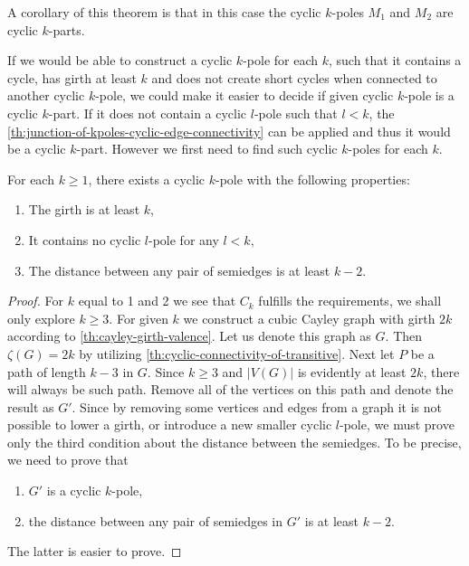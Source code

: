 \documentclass[12pt, twoside]{book}
\begin{document}
A corollary of this theorem is that in this case the cyclic $k$-poles $M_1$ and $M_2$ are cyclic $k$-parts.

If we would be able to construct a cyclic $k$-pole for each $k$, such that it contains a cycle, has girth at least $k$ and does not create short cycles when connected to another cyclic $k$-pole, we could make it easier to decide if given cyclic $k$-pole is a cyclic $k$-part. If it does not contain a cyclic $l$-pole such that $l<k$, the \cref{th:junction-of-kpoles-cyclic-edge-connectivity} can be applied and thus it would be a cyclic $k$-part. However we first need to find such cyclic $k$-poles for each $k$. 


\begin{lemma}\label{lem:cyclic-k-pole-no-short-cycles-exists}
	For each $k\geq 1$, there exists a cyclic $k$-pole with the following properties:
	\begin{enumerate}
		\item The girth is at least $k$,
		\item It contains no cyclic $l$-pole for any $l<k$,
		\item The distance between any pair of semiedges is at least $k-2$.
	\end{enumerate}
\end{lemma}

\begin{proof}
	For $k$ equal to 1 and 2 we see that $C_k$ fulfills the requirements, we shall only explore $k\geq 3$. For given $k$ we construct a cubic Cayley graph with girth $2k$ according to \cref{th:cayley-girth-valence}. Let us denote this graph as $G$. Then $\zeta(G)=2k$ by utilizing \cref{th:cyclic-connectivity-of-transitive}. Next let $P$ be a path of length $k-3$ in $G$. Since $k\geq 3$ and $|V(G)|$ is evidently at least $2k$, there will always be such path. Remove all of the vertices on this path and denote the result as $G'$. Since by removing some vertices and edges from a graph it is not possible to lower a girth, or introduce a new smaller cyclic $l$-pole, we must prove only the third condition about the distance between the semiedges. To be precise, we need to prove that
	\begin{enumerate}
		\item $G'$ is a cyclic $k$-pole,
		\item the distance between any pair of semiedges in $G'$ is at least $k-2$.
	\end{enumerate}
	The latter is easier to prove. 
	
\end{proof}
\end{document}
